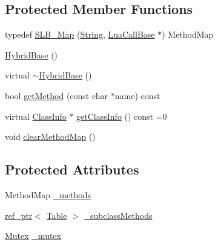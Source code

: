 \subsection*{Protected Member Functions}
\begin{DoxyCompactItemize}
\item 
typedef \hyperlink{classSLB_1_1HybridBase_a13c9e4f1948e197d9efc05292df8eae3}{S\+L\+B\+\_\+\+Map} (\hyperlink{namespaceSLB_a6a4c36e7004d99c0535c2c91c200c9a1}{String}, \hyperlink{classSLB_1_1LuaCallBase}{Lua\+Call\+Base} $\ast$) Method\+Map
\item 
\hyperlink{classSLB_1_1HybridBase_a16559130fd99772d21562b9d2a609084}{Hybrid\+Base} ()
\item 
virtual \hyperlink{classSLB_1_1HybridBase_ad2fe12eb6cbc98354f09455e6a0881e0}{$\sim$\+Hybrid\+Base} ()
\item 
bool \hyperlink{classSLB_1_1HybridBase_a62ce6256989bb7407f90b3171bf59dd6}{get\+Method} (const char $\ast$name) const 
\item 
virtual \hyperlink{classSLB_1_1ClassInfo}{Class\+Info} $\ast$ \hyperlink{classSLB_1_1HybridBase_a2418a2bc2b0965c7215f9face34845b9}{get\+Class\+Info} () const =0
\item 
void \hyperlink{classSLB_1_1HybridBase_ad5b819ae5cc1becd191bda707b85954a}{clear\+Method\+Map} ()
\end{DoxyCompactItemize}
\subsection*{Protected Attributes}
\begin{DoxyCompactItemize}
\item 
Method\+Map \hyperlink{classSLB_1_1HybridBase_af7527f38ec958cd7b54593442197b0ca}{\+\_\+methods}
\item 
\hyperlink{classSLB_1_1ref__ptr}{ref\+\_\+ptr}$<$ \hyperlink{classSLB_1_1Table}{Table} $>$ \hyperlink{classSLB_1_1HybridBase_a600895808a766860632acb471dd09f3c}{\+\_\+subclass\+Methods}
\item 
\hyperlink{structSLB_1_1Mutex}{Mutex} \hyperlink{classSLB_1_1HybridBase_a276d33834335774a86f6b05bf377c457}{\+\_\+mutex}
\end{DoxyCompactItemize}
